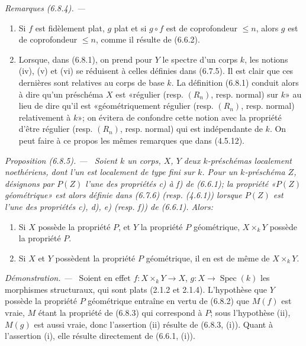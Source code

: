 \documentclass[10pt,oneside]{book}
\newenvironment{proposition}[1][]{%
  \par\medskip\noindent\itshape Proposition (#1). ---\ }{\par}
\newenvironment{remarks}[1][]{%
  \par\medskip\noindent\itshape Remarques (#1). ---\ }{\par}
\newenvironment{proof}{%
  \par\medskip\noindent\textit{Démonstration. ---\ }}{\par}
\begin{document}
\begin{remarks}[6.8.4]
\label{IV.2.s6.8.4-fr}
\begin{enumerate}
\item[(i)] Si $f$ est fidèlement plat, $g$ plat et si $g\circ f$ est de
coprofondeur $\leq n$, alors $g$ est de coprofondeur $\leq n$, comme il
résulte de (6.6.2).
\item[(ii)] Lorsque, dans (6.8.1), on prend pour $Y$ le spectre d'un corps
$k$, les notions (iv), (v) et (vi) se réduisent à celles définies dans (6.7.5).
Il est clair que ces dernières sont relatives au corps de base $k$. La
définition (6.8.1) conduit alors à dire qu'un préschéma $X$ est «régulier
(resp. $(R_n)$, resp. normal) sur $k$» au lieu de dire qu'il est
«géométriquement régulier (resp. $(R_n)$, resp. normal) relativement à $k$»;
on évitera de confondre cette notion avec la propriété d'être régulier (resp.
$(R_n)$, resp. normal) qui est indépendante de $k$. On peut faire à ce propos
les mêmes remarques que dans (4.5.12).
\end{enumerate}
\end{remarks}

\begin{proposition}[6.8.5]
\label{IV.2.s6.8.5-fr}
Soient $k$ un corps, $X$, $Y$ deux $k$-préschémas localement noethériens,
dont l'un est localement de type fini sur $k$. Pour un $k$-préschéma $Z$,
désignons par $P(Z)$ l'une des propriétés c) à f) de (6.6.1); la propriété
«$P(Z)$ géométrique» est alors définie dans (6.7.6) (resp. (4.6.1)) lorsque
$P(Z)$ est l'une des propriétés c), d), e) (resp. f)) de (6.6.1). Alors:
\begin{enumerate}
\item[(i)] Si $X$ possède la propriété $P$, et $Y$ la propriété $P$
géométrique, $X\times_kY$ possède la propriété $P$.
\item[(ii)] Si $X$ et $Y$ possèdent la propriété $P$ géométrique, il en est
de même de $X\times_kY$.
\end{enumerate}
\end{proposition}

\begin{proof}
Soient en effet $f:X\times_kY\to X$, $g:X\to\operatorname{Spec}(k)$ les
morphismes structuraux, qui sont plats (2.1.2 et 2.1.4). L'hypothèse que
$Y$ possède la propriété $P$ géométrique entraîne en vertu de (6.8.2) que
$M(f)$ est vraie, $M$ étant la propriété de (6.8.3) qui correspond à $P$; sous
l'hypothèse (ii), $M(g)$ est aussi vraie, donc l'assertion (ii) résulte de
(6.8.3, (i)). Quant à l'assertion (i), elle résulte directement de (6.6.1, (i)).
\end{proof}
\end{document}

